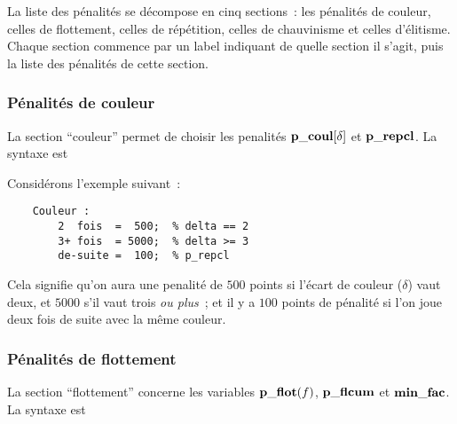 \documentclass[10pt]{article}
\begin{document}
La liste des pénalités se décompose en cinq sections~: les 
pénalités de couleur, celles de flottement, celles de 
répétition, celles de chauvinisme et celles d'élitisme.  Chaque 
section commence par un label indiquant de quelle section il s'agit, 
puis la liste des pénalités de cette section.

\medbreak
{}
\medbreak

\subsubsection{Pénalités de couleur}

La section ``couleur'' permet de choisir les penalités ${\bf p\_coul}
[\delta]$ et $\bf p\_repcl$. La syntaxe est

\medbreak
{}
\medbreak

\noindent Considérons l'exemple suivant~:
\begin{verbatim}
    Couleur :
        2  fois  =  500;  % delta == 2
        3+ fois  = 5000;  % delta >= 3
        de-suite =  100;  % p_repcl
\end{verbatim}
Cela signifie qu'on aura une penalité de $500$ points si l'écart de
couleur ($\delta$) vaut deux, et $5000$ s'il vaut trois {\em ou plus\/}~; et
il y a $100$ points de pénalité si l'on joue deux fois de suite avec la
même couleur.

\subsubsection{Pénalités de flottement}

La section ``flottement'' concerne les variables ${\bf p\_flot}(f)$,
$\bf p\_flcum$ et $\bf min\_fac$. La syntaxe est

\medbreak
{}
\medbreak
\end{document}
